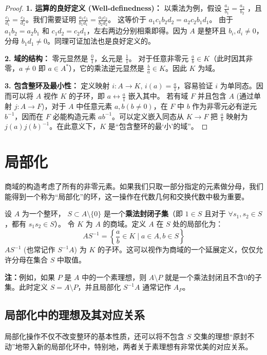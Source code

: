 \documentclass[11pt]{article}
\begin{document}
\begin{proof}
\textbf{1. 运算的良好定义 (Well-definedness)：} 
以乘法为例，假设 $\frac{a_1}{b_1} = \frac{a_2}{b_2}$ ，且 $\frac{c_1}{d_1} = \frac{c_2}{d_2}$。我们需要证明 $\frac{a_1c_1}{b_1d_1} = \frac{a_2c_2}{b_2d_2}$。
这等价于 $a_1 c_1 b_2 d_2 = a_2 c_2 b_1 d_1$。
由于 $a_1 b_2 = a_2 b_1$ 和 $c_1 d_2 = c_2 d_1$，左右两边分别相乘即得。因为 $A$ 是整环且 $b_i, d_i \neq 0$，分母 $b_1d_1 \neq 0$。同理可证加法也是良好定义的。

\textbf{2. 域的结构：}
零元显然是 $\frac{0}{1}$，幺元是 $\frac{1}{1}$。
对于任意非零元 $\frac{a}{b} \in K$（此时因其非零，$a \neq 0$ 即 $a \in A^*$），它的乘法逆元显然是 $\frac{b}{a} \in K$。因此 $K$ 为域。

\textbf{3. 包含整环及最小性：}
定义映射 $i: A \to K$, $i(a) = \frac{a}{1}$，容易验证 $i$ 为单同态。因而可以将 $A$ 视作 $K$ 的子环，即 $a \leftrightarrow \frac{a}{1}$ 嵌入其中。
若有域 $F$ 并且包含 $A$ (通过单射 $j: A \to F$)，对于 $A$ 中任意元素 $a, b(b \neq 0)$，在 $F$ 中 $b$ 作为非零元必有逆元 $b^{-1}$，因而在 $F$ 必能构造元素 $ab^{-1}$。可以定义嵌入同态从 $K \to F$ 把 $\frac{a}{b}$ 映射为 $j(a)j(b)^{-1}$。在此意义下，$K$ 是“包含整环的最‘小’的域”。
\end{proof}

\section{局部化}
商域的构造考虑了所有的非零元素。如果我们只取一部分指定的元素做分母，我们能得到一个称为“局部化”的环，这一操作在代数几何和交换代数中极为重要。

\begin{cndefinition}[局部化]
设 $A$ 为一个整环， $S \subset A \setminus \{0\}$ 是一个\textbf{乘法封闭子集}（即 $1 \in S$ 且对于 $\forall s_1, s_2 \in S$，都有 $s_1 s_2 \in S$）。
令 $K$ 为 $A$ 的商域。定义 $A$ 在 $S$ 处的局部化为：
$$ AS^{-1} = \left\{ \frac{a}{b} \in K \mid a \in A, b \in S \right\} $$
$AS^{-1}$ (也常记作 $S^{-1}A$) 为 $K$ 的子环。这可以视作为商域的一个延展定义，仅仅允许分母在集合 $S$ 中取值。
\end{cndefinition}
\textbf{注：}例如，如果 $P$ 是 $A$ 中的一个素理想，则 $A \setminus P$ 就是一个乘法封闭且不含0的子集。此时定义 $S = A \setminus P$，并且局部化 $S^{-1}A$ 通常记作 $A_P$。

\subsection{局部化中的理想及其对应关系}
局部化操作不仅不改变整环的基本性质，还可以将不包含 $S$ 交集的理想“原封不动”地带入新的局部化环中，特别地，两者关于素理想有非常优美的对应关系。
\end{document}
